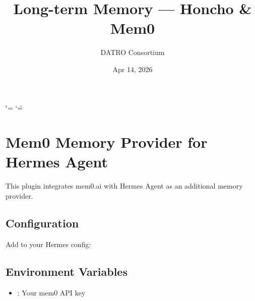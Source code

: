 \documentclass[a4paper,10pt,english,openany]{sphinxmanual}
\title{Long-term Memory — Honcho & Mem0}
\date{Apr 14, 2026}
\author{DATRO Consortium}
\begin{document}
\ifdefined\shorthandoff
  \ifnum\catcode`\=\string=\active\shorthandoff{=}\fi
  \ifnum\catcode`\"=\active{}\fi
\fi

\pagestyle{empty}
\sphinxmaketitle
\pagestyle{plain}
\sphinxtableofcontents
\pagestyle{normal}
\label{\detokenize{index::doc}}


\sphinxstepscope


\chapter{Mem0 Memory Provider for Hermes Agent}
\label{\detokenize{mem0-memory-plugin:mem0-memory-provider-for-hermes-agent}}\label{\detokenize{mem0-memory-plugin::doc}}
\sphinxAtStartPar
This plugin integrates mem0.ai with Hermes Agent as an additional memory provider.


\section{Configuration}
\label{\detokenize{mem0-memory-plugin:configuration}}
\sphinxAtStartPar
Add to your Hermes config:

\begin{sphinxVerbatim}[commandchars=\\\{\}]
\end{sphinxVerbatim}


\section{Environment Variables}
\label{\detokenize{mem0-memory-plugin:environment-variables}}\begin{itemize}
\item {} 
\sphinxAtStartPar
{}: Your mem0 API key

\end{itemize}
\end{document}

